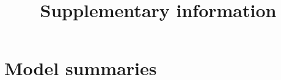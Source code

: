 \documentclass{article}
\title{Supplementary information}
\begin{document}
\maketitle


\section{Model summaries} 

\end{document}
